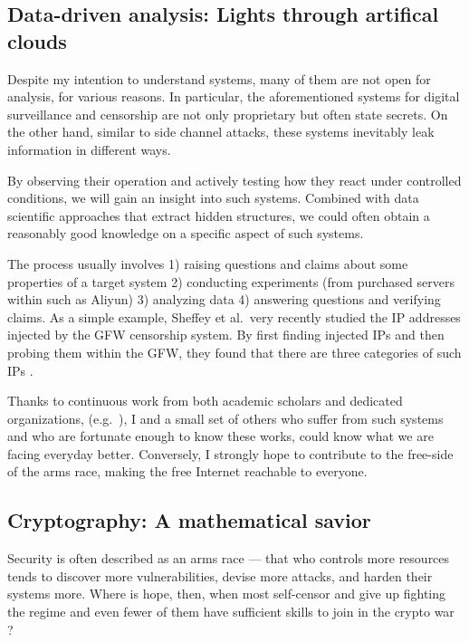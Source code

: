 \documentclass{article}
\begin{document}
\subsection{Data-driven analysis: Lights through artifical clouds}
Despite my intention to understand systems, many of them are not open for
analysis, for various reasons. In particular, the aforementioned systems for
digital surveillance and censorship are not only proprietary but often state
secrets. On the other hand, similar to side channel attacks, these systems
inevitably leak information in different ways.

By observing their operation and actively testing how they react under
controlled conditions, we will gain an insight into such systems. Combined with
data scientific approaches that extract hidden structures, we could often
obtain a reasonably good knowledge on a specific aspect of such systems. 

The process usually involves 1) raising questions and claims about some
properties of a target system 2) conducting experiments (from purchased servers
within such as Aliyun) 3) analyzing data 4) answering questions and verifying
claims. As a simple example, Sheffey et al.\ very recently studied the IP
addresses injected by the GFW censorship system. By first finding injected IPs
and then probing them within the GFW, they found that there are three
categories of such IPs \cite{gfw.injected.ip}. 

Thanks to continuous work from both academic scholars and dedicated
organizations, (e.g.\ \cite{data.analysis.1, data.analysis.2, censor.block.6}),
I and a small set of others who suffer from such systems and who are fortunate
enough to know these works, could know what we are facing everyday better.
Conversely, I strongly hope to contribute to the free-side of the arms race,
making the free Internet reachable to everyone.

\subsection{Cryptography: A mathematical savior} \label{sec.crypto}
Security is often described as an arms race --- that who controls more
resources tends to discover more vulnerabilities, devise more attacks, and
harden their systems more. Where is hope, then, when most self-censor and give
up fighting the regime \cite{self.censor.1, self.censor.2, self.censor.3}  and
even fewer of them have sufficient skills to join in the crypto war
\cite{defenders.lack.skills.1, defenders.lack.skills.2}?
\end{document}
